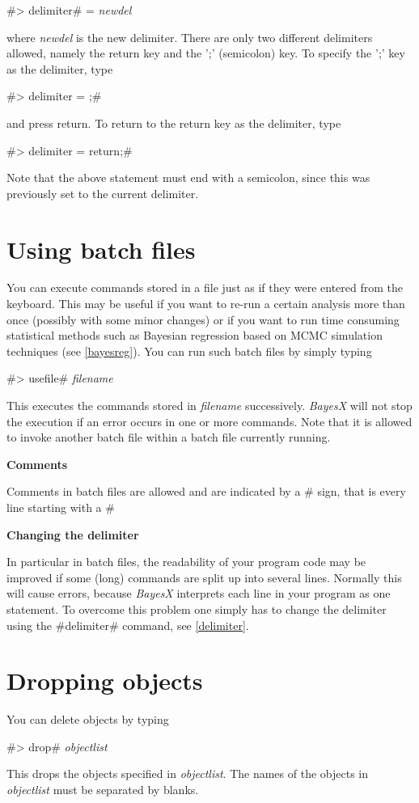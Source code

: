 #> delimiter# = {\em newdel}

where {\em newdel} is the new delimiter. There are only two
different delimiters allowed, namely the
return key and the ';' (semicolon) key. To specify the ';' key as the delimiter, type

#> delimiter = ;#

and press return. To return to the return key as the delimiter, type

#> delimiter = return;#

Note that the above statement must end with a semicolon, since
this was previously set to the current delimiter.


\section{Using batch files}
\label{batch} 

You can execute commands stored in a file just as if they were
entered from the keyboard. This may be useful if you want to
re-run a certain analysis more than once (possibly with some minor
changes) or if you want to run time consuming statistical methods
such as Bayesian regression based on MCMC simulation techniques
(see \autoref{bayesreg}).
You can run such batch files by simply typing

#> usefile# {\em filename}

This executes the commands stored in {\em filename} successively.
{\em BayesX} will not stop the execution if an error occurs in one
or more commands. Note that it is allowed to invoke
another batch file within a batch file currently running.


{\bf Comments}

Comments in batch files are allowed and are indicated by a  #%
sign, that is every line
starting with a #%

{\bf Changing the delimiter}

In particular in batch files, the readability of your program code
may be improved if some (long) commands are split up into several
lines. Normally this will cause errors, because {\em BayesX}
interprets each line in your program as one statement. To overcome
this problem one simply
has to change the delimiter using the #delimiter# command, see \autoref{delimiter}.


\section{Dropping objects}
 

You can delete objects by typing

#> drop# {\em objectlist}

This drops the objects specified in {\em objectlist}. The names of
the objects in {\em objectlist} must be separated by blanks.
